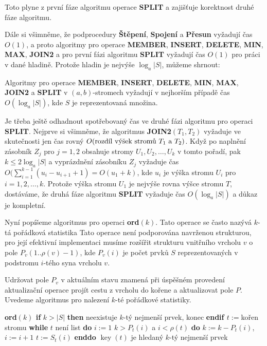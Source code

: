 \documentclass[a4paper,12pt]{article}
\DeclareMathOperator*{\key}{key}
\begin{document}
Toto plyne z první fáze algoritmu operace {\bf SPLIT} a zajišťuje 
korektnost druhé fáze algoritmu. 

Dále si všimněme, že podprocedury {\bf Štěpení}, {\bf Spojení} a {\bf Pře\-sun }
vyžadují čas $O(1)$, a proto algoritmy pro operace {\bf MEMBER}, 
{\bf INSERT}, {\bf DELETE}, {\bf MIN}, {\bf MAX}, {\bf JOIN2} a pro první fázi algoritmu 
{\bf SPLIT} vyžadují čas $O(1)$ pro práci v dané hladině.  Protože 
hladin je nejvýše $\log_a|S|$, můžeme shrnout: 

\begin{veta}Algoritmy pro operace {\bf MEMBER}, {\bf INSERT}, 
{\bf DE\-LETE}, {\bf MIN}, {\bf MAX}, {\bf JOIN2} a {\bf SPLIT} v $
(a,b)$-stromech vy\-žadují 
v nejhorším případě čas $O(\log_a|S|)$, kde $
S$ je 
re\-pre\-zen\-tovaná množina.  
\end{veta}

Je třeba ještě odhadnout spotřebovaný čas ve druhé fázi 
algoritmu pro operaci {\bf SPLIT}. Nejprve si všimněme, že 
algoritmus {\bf JOIN2$(T_1,T_2)$} vyžaduje ve skutečnosti jen čas 
rovný 
$O(\text{\rm rozdíl výšek stromů }T_1\text{\rm \ a }
T_2)$. Když po naplnění 
zásobník $Z_j$ pro $j=1,2$ obsahuje stromy $U_1,U_2,\dots,U_
k$ v tomto 
pořadí, pak $k\le 2\log_a|S|$ a vyprázdnění zásobníku $
Z_j$ 
vyžaduje 
čas $O(\sum_{i=1}^{k-1}(u_i-u_{i+1}+1)=O(u_1+k)$, kde $u_i$ je výška stromu $
U_i$ pro 
$i=1,2,\dots,k$. Protože výška stromu $U_1$ je nejvýše rovna výšce 
stromu $T$, dostáváme, že druhá fáze algoritmu {\bf SPLIT} vyžaduje 
čas $O(\log_a|S|)$ a důkaz je kompletní. 

Nyní popíšeme algoritmus pro operaci {\bf ord$
(k)$}. Tato 
operace se často nazývá $k$-tá pořádko\-vá statistika
Tato operace není podporována navrženou 
strukturou, pro její efektivní implementaci musíme 
rozšířit strukturu vnitřního vrcholu $v$ o pole\newline 
$P_v(1..\rho (v)-1)$, kde $P_v(i)$ je počet prvků $S$ reprezentovaných 
v podstromu $i$-tého syna vrcholu $v$.

 

Udržovat pole $P_v$ v aktuálním stavu znamená při úspěšném 
pro\-vedení aktualizační operace projít cestu z vrcholu do koře\-ne 
a aktualizovat pole $P$. Uvedeme algoritmus pro 
naleze\-ní $k$-té pořádkové statistiky.

{\bf ord$(k)$\newline 
if} $k>|S|$ {\bf then} neexistuje $k$-tý nejmenší prvek, konec 
{\bf endif\newline 
$t:=$}kořen stromu\newline 
{\bf while} $t$ není list {\bf do}\newline 
\phantom{---}$i:=1$\newline 
\phantom{---}{\bf while} $k>P_t(i)$ a $i<\rho (t)$ {\bf do}\newline 
\phantom{------}$k:=k-P_t(i)$, $i:=i+1$\newline 
\phantom{---}{\bf enddo}\newline 
\phantom{---}$t:=S_t(i)$\newline 
{\bf enddo}\newline 
$\key(t)$ je hledaný $k$-tý nejmenší prvek
\end{document}
